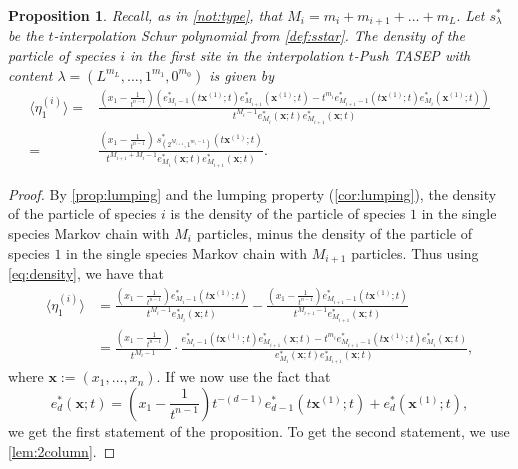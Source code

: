 \documentclass[10pt,a4paper]{amsart}
\newtheorem{prop}{Proposition}
\newcommand{\bfx}{\boldsymbol{x}}
\begin{document}
\begin{prop}\label{prop:density}
Recall, as in \cref{not:type}, that  $M_i = m_i+m_{i+1} + \dots + m_L.$  Let $s^*_{\lambda}$ be the $t$-interpolation Schur polynomial from \cref{def:sstar}.
   The density of the particle of species $i$ in the first site in 
   the interpolation $t$-Push TASEP with content $\lambda=(L^{m_L}, \dots, 1^{m_1}, 0^{m_0})$ is given by
   \small{
   \begin{align*}
       \langle \eta_1^{(i)} \rangle =&
       \frac{(x_1-\frac{1}{t^{n-1}}) \left(e_{M_i-1}^*\left(t\bfx^{(1)};t\right) e^*_{M_{i+1}}\left(\bfx^{(1)};t\right)  - t^{m_i} e_{M_{i+1}-1}^*\left(t\bfx^{(1)};t\right) e_{M_i}^*\left(\bfx^{(1)};t\right) \right)}{t^{M_{i}-1} e^*_{M_i}\left(\bfx;t\right) e^*_{M_{i+1}}\left(\bfx;t\right)} \\
       =&
       \frac{(x_1-\frac{1}{t^{n-1}}) 
       \ s^*_{(2^{M_{i+1}},1^{m_i-1})}\left(t\bfx^{(1)};t\right)
       }{t^{M_{i+1}+M_i-1} e^*_{M_i}\left(\bfx;t\right)e^*_{M_{i+1}}\left(\bfx;t\right)}.
   \end{align*}}
\end{prop}

\begin{proof}
By \cref{prop:lumping} and the lumping property (\cref{cor:lumping}),  the density of the particle
    of species $i$ is the density of the particle of species $1$ in the single species
    Markov chain with $M_i$ particles, minus the density of the particle of species $1$
    in the single species Markov chain with $M_{i+1}$ particles.
    Thus using \cref{eq:density}, we have that 
     \begin{align*}
       \langle \eta_1^{(i)} \rangle &= 
       \frac{(x_1-\frac{1}{t^{n-1}}) e^*_{M_i-1}\left(t\bfx^{(1)};t\right)}{t^{M_i-1} e^*_{M_i}(\bfx;t)}  - \frac{(x_1-\frac{1}{t^{n-1}}) e^*_{M_{i+1}-1}\left(t\bfx^{(1)};t\right)}{t^{M_{i+1}-1} e^*_{M_{i+1}}(\bfx;t)} \\
       &= \frac{(x_1-\frac{1}{t^{n-1}})}{t^{M_{i}-1}} \cdot 
       \frac{e^*_{M_i-1}\left(t\bfx^{(1)};t\right) e^*_{M_{i+1}}(\bfx;t)-t^{m_i} e^*_{M_{i+1}-1}\left(t\bfx^{(1)};t\right) e^*_{M_i}(\bfx;t)}{e^*_{M_i}(\bfx;t) e^*_{M_{i+1}}(\bfx;t)}, \label{eq:sofar}
   \end{align*}
   where $\bfx:=(x_1,\dots,x_n)$.
If we now use the fact that 
\begin{equation}
e^*_d(\bfx;t) = \left(x_1-\frac{1}{t^{n-1}}\right) t^{-(d-1)} e^*_{d-1}\left(t\bfx^{(1)};t\right) + e^*_d\left(\bfx^{(1)};t\right),    
\end{equation}
we get the first statement of the proposition.  To get the second statement, we use \cref{lem:2column}.
\end{proof}
\end{document}
